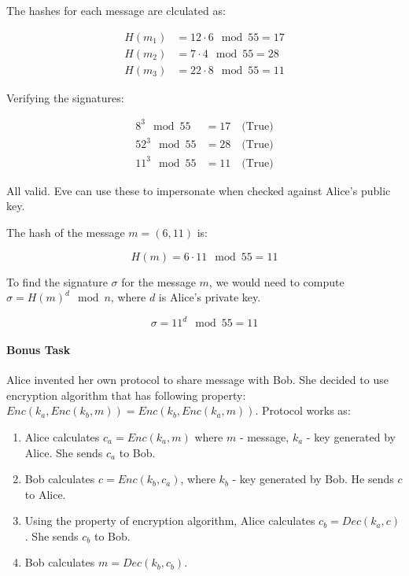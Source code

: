 \documentclass{article}
\begin{document}
The hashes for each message are clculated as:

\begin{align*}
    H(m_1) &= 12 \cdot 6 \mod 55 = 17 \\
    H(m_2) &= 7 \cdot 4 \mod 55 = 28 \\
    H(m_3) &= 22 \cdot 8 \mod 55 = 11
\end{align*}

Verifying the signatures:

\begin{align*}
    8^3 \mod 55 &= 17 \quad \text{(True)} \\
    52^3 \mod 55 &= 28 \quad \text{(True)} \\
    11^3 \mod 55 &= 11 \quad \text{(True)}
\end{align*}

All valid. Eve can use these to impersonate when checked against Alice's public key.


The hash of the message \( m = (6, 11) \) is:

\begin{equation*}
    H(m) = 6 \cdot 11 \mod 55 = 11
\end{equation*}

To find the signature \(\sigma\) for the message \(m\), we would need to compute \(\sigma = H(m)^d \mod n\), where \(d\) is Alice's private key.

\begin{equation*}
    \sigma = 11^d \mod 55 = 11
\end{equation*}

\paragraph{Bonus Task} 
Alice invented her own protocol to share message with Bob.
She decided to use encryption algorithm that has following property: $Enc(k_a, Enc(k_b, m)) = Enc(k_b, Enc(k_a, m))$.
Protocol works as:
\begin{enumerate}
    \item Alice calculates $c_a = Enc(k_a, m)$ where $m$ - message, $k_a$ - key generated by Alice. She sends $c_a$ to Bob. 
    \item Bob calculates $c=Enc(k_b, c_a)$, where $k_b$ - key generated by Bob. He sends $c$ to Alice.
    \item Using the property of encryption algorithm, Alice calculates $c_b=Dec(k_a, c)$. She sends $c_b$ to Bob.
    \item Bob calculates $m=Dec(k_b, c_b)$.
\end{enumerate}
\end{document}
